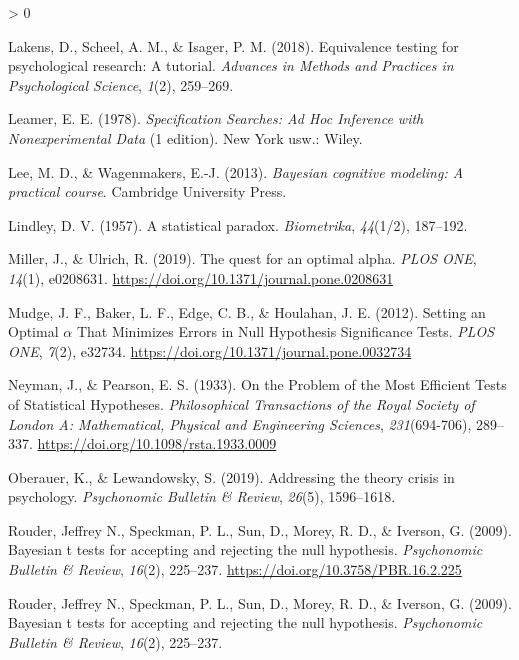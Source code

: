 \documentclass[
  english,
  ,jou,floatsintext]{apa6}
\newlength{\cslhangindent}
\newenvironment{CSLReferences}[2] %
 {%
  \setlength{\parindent}{0pt}
  \ifodd #1 \everypar{\setlength{\hangindent}{\cslhangindent}}\ignorespaces\fi
  \ifnum #2 > 0
  \setlength{\parskip}{#2\baselineskip}
  \fi
 }%
 {}
\begin{document}
\begin{CSLReferences}{1}{0}
\leavevmode\hypertarget{ref-lakens2018equivalence}{}%
Lakens, D., Scheel, A. M., \& Isager, P. M. (2018). Equivalence testing for psychological research: A tutorial. \emph{Advances in Methods and Practices in Psychological Science}, \emph{1}(2), 259--269.

\leavevmode\hypertarget{ref-leamer_specification_1978}{}%
Leamer, E. E. (1978). \emph{Specification {Searches}: {Ad Hoc Inference} with {Nonexperimental Data}} (1 edition). {New York usw.}: {Wiley}.

\leavevmode\hypertarget{ref-LeeWagenmakersBayesBook}{}%
Lee, M. D., \& Wagenmakers, E.-J. (2013). \emph{Bayesian cognitive modeling: {A} practical course}. Cambridge University Press.

\leavevmode\hypertarget{ref-lindley_statistical_1957}{}%
Lindley, D. V. (1957). A statistical paradox. \emph{Biometrika}, \emph{44}(1/2), 187--192.

\leavevmode\hypertarget{ref-miller_quest_2019}{}%
Miller, J., \& Ulrich, R. (2019). The quest for an optimal alpha. \emph{PLOS ONE}, \emph{14}(1), e0208631. \url{https://doi.org/10.1371/journal.pone.0208631}

\leavevmode\hypertarget{ref-mudge_setting_2012}{}%
Mudge, J. F., Baker, L. F., Edge, C. B., \& Houlahan, J. E. (2012). Setting an {Optimal} {\(\alpha\)} {That Minimizes Errors} in {Null Hypothesis Significance Tests}. \emph{PLOS ONE}, \emph{7}(2), e32734. \url{https://doi.org/10.1371/journal.pone.0032734}

\leavevmode\hypertarget{ref-neyman_problem_1933}{}%
Neyman, J., \& Pearson, E. S. (1933). On the {Problem} of the {Most Efficient Tests} of {Statistical Hypotheses}. \emph{Philosophical Transactions of the Royal Society of London A: Mathematical, Physical and Engineering Sciences}, \emph{231}(694-706), 289--337. \url{https://doi.org/10.1098/rsta.1933.0009}

\leavevmode\hypertarget{ref-oberauer2019addressing}{}%
Oberauer, K., \& Lewandowsky, S. (2019). Addressing the theory crisis in psychology. \emph{Psychonomic Bulletin \& Review}, \emph{26}(5), 1596--1618.

\leavevmode\hypertarget{ref-rouder_bayesian_2009}{}%
Rouder, Jeffrey N., Speckman, P. L., Sun, D., Morey, R. D., \& Iverson, G. (2009). Bayesian t tests for accepting and rejecting the null hypothesis. \emph{Psychonomic Bulletin \& Review}, \emph{16}(2), 225--237. \url{https://doi.org/10.3758/PBR.16.2.225}

\leavevmode\hypertarget{ref-rouder2009bayesian}{}%
Rouder, Jeffrey N., Speckman, P. L., Sun, D., Morey, R. D., \& Iverson, G. (2009). Bayesian t tests for accepting and rejecting the null hypothesis. \emph{Psychonomic Bulletin \& Review}, \emph{16}(2), 225--237.


\end{CSLReferences}
\end{document}
